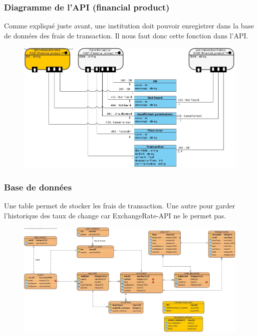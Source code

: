 \documentclass[../rapport.tex]{subfiles}
\begin{document}
\subsubsection{Diagramme de l'API (financial product)}
Comme expliqué juste avant, une institution doit pouvoir enregistrer dans la base de données des frais de transaction. Il nous faut donc cette fonction dans l'API.
\begin{figure}[H]
    \includegraphics[scale=0.288]{ressources/photos_diagrammes/extensionUgo/financial_productAPI.jpg}
\end{figure}

\subsubsection{Base de données}
Une table permet de stocker les frais de transaction. Une autre pour garder l'historique des taux de change car ExchangeRate-API ne le permet pas.
\begin{figure}[H]
    \includegraphics[scale=0.288]{ressources/photos_diagrammes/extensionUgo/ERD.jpg}
\end{figure}
\end{document}
